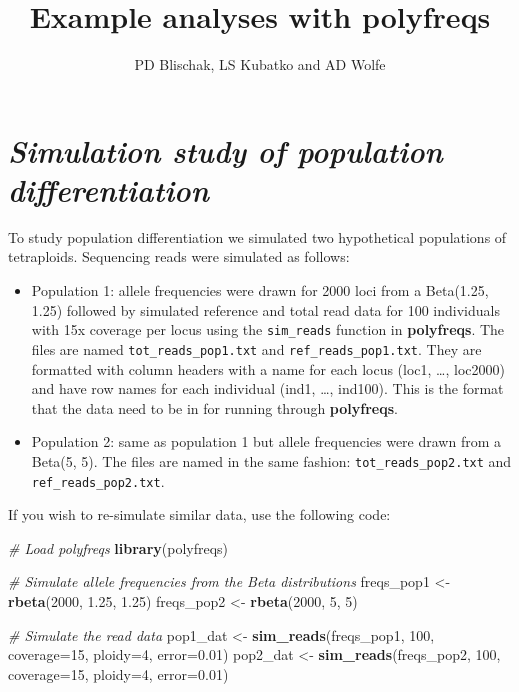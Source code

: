 \documentclass[]{article}
\title{Example analyses with \textbf{polyfreqs}}
\author{PD Blischak, LS Kubatko and AD Wolfe}
\date{}
\newenvironment{Shaded}{\begin{snugshade}}{\end{snugshade}}
\newcommand{\KeywordTok}[1]{\textcolor[rgb]{0.13,0.29,0.53}{\textbf{{#1}}}}
\newcommand{\DataTypeTok}[1]{\textcolor[rgb]{0.13,0.29,0.53}{{#1}}}
\newcommand{\DecValTok}[1]{\textcolor[rgb]{0.00,0.00,0.81}{{#1}}}
\newcommand{\FloatTok}[1]{\textcolor[rgb]{0.00,0.00,0.81}{{#1}}}
\newcommand{\StringTok}[1]{\textcolor[rgb]{0.31,0.60,0.02}{{#1}}}
\newcommand{\CommentTok}[1]{\textcolor[rgb]{0.56,0.35,0.01}{\textit{{#1}}}}
\newcommand{\NormalTok}[1]{{#1}}
\begin{document}
\maketitle


\section{\texorpdfstring{\emph{Simulation study of population
differentiation}}{Simulation study of population differentiation}}\label{simulation-study-of-population-differentiation}

To study population differentiation we simulated two hypothetical
populations of tetraploids. Sequencing reads were simulated as follows:

\begin{itemize}
\item
  Population 1: allele frequencies were drawn for 2000 loci from a
  Beta(1.25, 1.25) followed by simulated reference and total read data
  for 100 individuals with 15x coverage per locus using the
  \texttt{sim\_reads} function in \textbf{polyfreqs}. The files are
  named \texttt{tot\_reads\_pop1.txt} and \texttt{ref\_reads\_pop1.txt}.
  They are formatted with column headers with a name for each locus
  (loc1, \ldots{}, loc2000) and have row names for each individual
  (ind1, \ldots{}, ind100). This is the format that the data need to be
  in for running through \textbf{polyfreqs}.
\item
  Population 2: same as population 1 but allele frequencies were drawn
  from a Beta(5, 5). The files are named in the same fashion:
  \texttt{tot\_reads\_pop2.txt} and \texttt{ref\_reads\_pop2.txt}.
\end{itemize}

If you wish to re-simulate similar data, use the following code:

\begin{Shaded}
\begin{Highlighting}[]
\CommentTok{# Load polyfreqs}
\KeywordTok{library}\NormalTok{(polyfreqs)}

\CommentTok{# Simulate allele frequencies from the Beta distributions}
\NormalTok{freqs_pop1 <-}\StringTok{ }\KeywordTok{rbeta}\NormalTok{(}\DecValTok{2000}\NormalTok{, }\FloatTok{1.25}\NormalTok{, }\FloatTok{1.25}\NormalTok{)}
\NormalTok{freqs_pop2 <-}\StringTok{ }\KeywordTok{rbeta}\NormalTok{(}\DecValTok{2000}\NormalTok{, }\DecValTok{5}\NormalTok{, }\DecValTok{5}\NormalTok{)}


\CommentTok{# Simulate the read data}
\NormalTok{pop1_dat <-}\StringTok{ }\KeywordTok{sim_reads}\NormalTok{(freqs_pop1, }\DecValTok{100}\NormalTok{, }\DataTypeTok{coverage=}\DecValTok{15}\NormalTok{, }\DataTypeTok{ploidy=}\DecValTok{4}\NormalTok{, }\DataTypeTok{error=}\FloatTok{0.01}\NormalTok{)}
\NormalTok{pop2_dat <-}\StringTok{ }\KeywordTok{sim_reads}\NormalTok{(freqs_pop2, }\DecValTok{100}\NormalTok{, }\DataTypeTok{coverage=}\DecValTok{15}\NormalTok{, }\DataTypeTok{ploidy=}\DecValTok{4}\NormalTok{, }\DataTypeTok{error=}\FloatTok{0.01}\NormalTok{)}
\end{Highlighting}
\end{Shaded}
\end{document}
